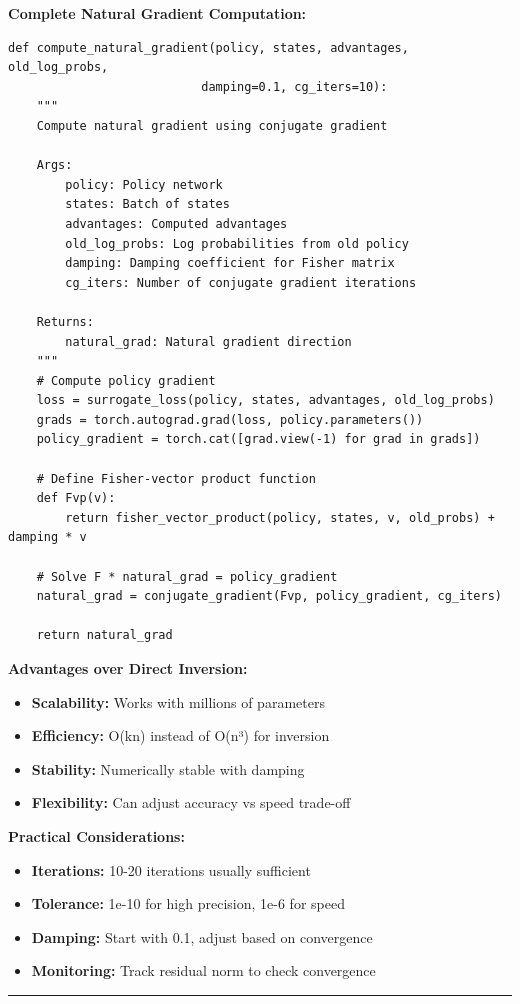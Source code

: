 \documentclass[12pt]{article}
\begin{document}
{{\textbf{Complete Natural Gradient Computation:}

\begin{verbatim}
def compute_natural_gradient(policy, states, advantages, old_log_probs, 
                           damping=0.1, cg_iters=10):
    """
    Compute natural gradient using conjugate gradient
    
    Args:
        policy: Policy network
        states: Batch of states
        advantages: Computed advantages
        old_log_probs: Log probabilities from old policy
        damping: Damping coefficient for Fisher matrix
        cg_iters: Number of conjugate gradient iterations
    
    Returns:
        natural_grad: Natural gradient direction
    """
    # Compute policy gradient
    loss = surrogate_loss(policy, states, advantages, old_log_probs)
    grads = torch.autograd.grad(loss, policy.parameters())
    policy_gradient = torch.cat([grad.view(-1) for grad in grads])
    
    # Define Fisher-vector product function
    def Fvp(v):
        return fisher_vector_product(policy, states, v, old_probs) + damping * v
    
    # Solve F * natural_grad = policy_gradient
    natural_grad = conjugate_gradient(Fvp, policy_gradient, cg_iters)
    
    return natural_grad
\end{verbatim}

\textbf{Advantages over Direct Inversion:}

\begin{itemize}
\item \textbf{Scalability:} Works with millions of parameters
\item \textbf{Efficiency:} O(kn) instead of O(n³) for inversion
\item \textbf{Stability:} Numerically stable with damping
\item \textbf{Flexibility:} Can adjust accuracy vs speed trade-off
\end{itemize}

\textbf{Practical Considerations:}

\begin{itemize}
\item \textbf{Iterations:} 10-20 iterations usually sufficient
\item \textbf{Tolerance:} 1e-10 for high precision, 1e-6 for speed
\item \textbf{Damping:} Start with 0.1, adjust based on convergence
\item \textbf{Monitoring:} Track residual norm to check convergence
\end{itemize}

\noindent\rule{\textwidth}{0.2pt}
}}
\end{document}
